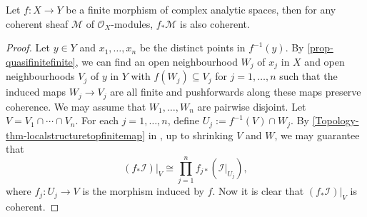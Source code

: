 \begin{theorem}\label{thm-finitepushcoherent}
    Let $f:X\rightarrow Y$ be a finite morphism of complex analytic spaces, then for any coherent sheaf $\mathcal{M}$ of $\mathcal{O}_X$-modules, $f_*\mathcal{M}$ is also coherent.
\end{theorem}
\begin{proof}
    Let $y\in Y$ and $x_1,\ldots,x_n$ be the distinct points in $f^{-1}(y)$. By \cref{prop-quasifinitefinite}, we can find an open neighbourhood $W_j$ of $x_j$ in $X$ and open neighbourhoods $V_j$ of $y$ in $Y$ with $f(W_j)\subseteq V_j$ for $j=1,\ldots,n$ such that the induced maps $W_j\rightarrow V_j$ are all finite and pushforwards along these maps preserve coherence. We may assume that $W_1,\ldots,W_n$ are pairwise disjoint.
    Let $V=V_1\cap \cdots\cap V_n$. For each $j=1,\ldots,n$, define $U_j:=f^{-1}(V)\cap W_j$. By \cref{Topology-thm-localstructuretopfinitemap} in , up to shrinking $V$ and $W$, we may guarantee that
    \[
        (f_*\mathcal{I})|_V\cong \prod_{j=1}^n f_{j*}(\mathcal{I}|_{U_j}),
    \]
    where $f_j:U_j\rightarrow V$ is the morphism induced by $f$. Now it is clear that $(f_*\mathcal{I})|_V$ is coherent.
\end{proof}

\fi